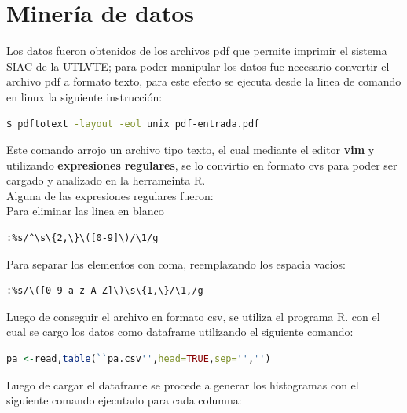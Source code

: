 \documentclass[a4pa<per,12pt,spanish]{article}
\begin{document}
\section{Minería de datos}
\label{sec:procesamiento-de-la}
Los datos fueron obtenidos de los archivos  pdf que permite imprimir el sistema SIAC de la UTLVTE; para poder manipular los datos fue necesario convertir el archivo  pdf a formato texto, para este efecto se ejecuta  desde la linea de comando en linux la siguiente instrucción:\\


\begin{lstlisting}[language=bash]
  $ pdftotext -layout -eol unix pdf-entrada.pdf
\end{lstlisting}

\vspace{0.5cm}
Este comando arrojo un archivo tipo texto, el cual mediante el editor \textbf{vim} y  utilizando \textbf{expresiones regulares}, se lo convirtio en formato  cvs para poder ser cargado y analizado en la herrameinta R.\\

Alguna de las expresiones regulares fueron:\\
Para eliminar las linea en blanco

\begin{lstlisting}[language=vim]
  :%s/^\s\{2,\}\([0-9]\)/\1/g
\end{lstlisting}

Para separar los elementos con coma, reemplazando los espacia vacios: \\

\begin{lstlisting}[language=vim]
  :%s/\([0-9 a-z A-Z]\)\s\{1,\}/\1,/g
\end{lstlisting}






Luego de conseguir el archivo en formato csv, se utiliza el programa R. con el cual se cargo los datos como dataframe utilizando el siguiente comando:\\

\begin{lstlisting}[language=R]
pa <-read,table(``pa.csv'',head=TRUE,sep='','')
\end{lstlisting}

\vspace{0.5cm}

Luego de cargar el dataframe se procede a generar los histogramas con el siguiente comando ejecutado para cada columna:\\
\end{document}
